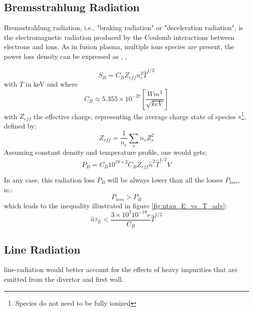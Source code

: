 \subsection{Bremsstrahlung Radiation}
Bremsstrahlung radiation, i.e., "braking radiation" or "deceleration radiation", is the electromagnetic radiation produced by the Coulomb interactions between electrons and ions. As in fusion plasma, multiple ions species are present, the power loss density can be expressed as \cite[sec.3.3]{FusionCEA1987}, \cite[sec.4.24]{Wesson2004}, \cite[sec.3.5.4]{Freidberg2007}

\begin{equation}
S_B
=
C_B Z_{eff} n_e^2 \hat T^{1/2}
\end{equation}
with $\hat T$ in keV and where 
\begin{equation*}
C_B 
\approx
5.355 \times 10^{-37} \left[ \frac{W m^3}{ \sqrt{keV}} \right]
\end{equation*}
with $Z_{eff}$ the effective charge, representing the average
charge state of species $s$\footnote{Species do not need to be fully ionized}, defined by:
\begin{equation}
Z_{eff}
=
\frac{1}{n_e}
\sum_s
n_s Z_s^2
\label{eq:effective_charge_adv}
\end{equation}
Assuming constant density and temperature profile, one would gets:
\begin{equation}
	P_B
	=
	C_B 10^{19\times 2} 
	C_B Z_{eff} \hat n^2 \hat T^{1/2}
	V
\label{eq:Bremsstrahlung_Power_Loss}
\end{equation}

In any case, this radiation loss $P_B$ will be always lower than all the losses $P_{loss}$, ie.:
\begin{equation*}
	P_{loss} > P_B
\end{equation*}
which leads to the inequality illustrated in figure \ref{fig:ntau_E_vs_T_adv}:
\begin{equation}
	\hat n \tau_E < \frac{3\times 10^3 10^{-19} e }{C_B} \hat T^{1/2}
\end{equation}

\subsection{Line Radiation}
line-radiation would better account for the effects of heavy impurities that are emitted from the divertor and first wall.

